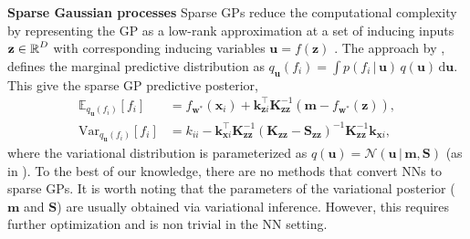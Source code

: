 \documentclass{article}
\newcommand{\mbf}[1]{\mathbf{#1}}
\renewcommand{\mid}{\,|\,}
\newcommand{\MS}{\mbf{S}}
\newcommand{\vm}{\mbf{m}}
\newcommand{\vz}{\mbf{z}}
\newcommand{\vu}{\mbf{u}}
\newcommand{\vx}{\mbf{x}}
\newcommand{\vw}{\mbf{w}}
\newcommand{\MKzz}{\mbf{K}_{\mbf{z}\mbf{z}}}
\newcommand{\vk}{\mbf{k}}
\newcommand{\myexpect}{\mathbb{E}}
\begin{document}






\textbf{Sparse Gaussian processes}
Sparse GPs reduce the computational complexity by representing the GP as a low-rank approximation at a set of inducing
inputs $\vz \in \R^{D}$ with corresponding inducing variables $\vu = f(\vz)$ \citep[see][for an early overview]{quinonero2005unifying}.
The approach by \citet{titsias2009variational} \citep[also used in the DTC approximation, see][]{quinonero2005unifying},
defines the marginal predictive distribution as $q_{\vu}(f_i)  = \int p(f_i  \mid \vu) \, q(\vu) \, \mathrm{d}\vu$.
This give the sparse GP predictive posterior,
\begin{subequations}  \label{eq-svgp-pred}
\begin{align}
  \myexpect_{q_{\vu}(f_i)}[f_i] &= f_{\vw^{*}}(\vx_{i}) + \vk_{\vz i}^{\top}\MKzz^{-1}(\vm - f_{\vw^{*}}(\vz)), \\
  \mathrm{Var}_{q_{\vu}(f_i)}[f_i] &= k_{ii} - \vk_{\vx i}^\top \MKzz^{-1}( \MKzz - \MS_{\vz\vz} )^{-1} \MKzz^{-1} \vk_{\vx i},  \nonumber
\end{align}
\end{subequations}
where the variational distribution is parameterized as $q(\vu) = \mathcal{N}\left(\vu \mid \vm, \MS \right)$ (as in \citet{titsias2009variational,hensman2013gaussian}).
To the best of our knowledge, there are no methods that convert NNs to sparse GPs.
It is worth noting that the parameters of the variational posterior ($\vm$ and $\MS$) are usually obtained via variational inference.
However, this requires further optimization and is non trivial in the NN setting.
\end{document}
